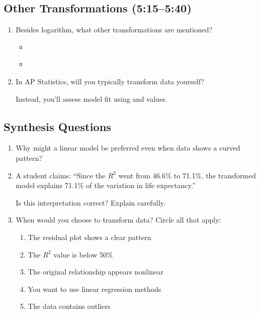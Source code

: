\documentclass[11pt]{article}
\begin{document}
\subsection*{Other Transformations (5:15--5:40)}
\begin{enumerate}[resume, label=\arabic*.]
\item Besides logarithm, what other transformations are mentioned?
\begin{itemize}
\item \underline{\hspace{1.5in}}
\item \underline{\hspace{1.5in}}
\end{itemize}

\item In AP Statistics, will you typically transform data yourself? \underline{\hspace{0.5in}}

Instead, you'll assess model fit using \underline{\hspace{1.5in}} and \underline{\hspace{0.5in}} values.
\end{enumerate}

\subsection*{Synthesis Questions}
\begin{enumerate}[resume, label=\arabic*.]
\item Why might a linear model be preferred even when data shows a curved pattern?

\vspace{1.5em}

\item A student claims: ``Since the $R^2$ went from 46.6\% to 71.1\%, the transformed model explains 71.1\% of the variation in life expectancy.'' 

Is this interpretation correct? Explain carefully.

\vspace{2em}

\item When would you choose to transform data? Circle all that apply:
\begin{enumerate}[label=\alph*)]
\item The residual plot shows a clear pattern
\item The $R^2$ value is below 50\%
\item The original relationship appears nonlinear
\item You want to use linear regression methods
\item The data contains outliers
\end{enumerate}
\end{enumerate}
\end{document}
